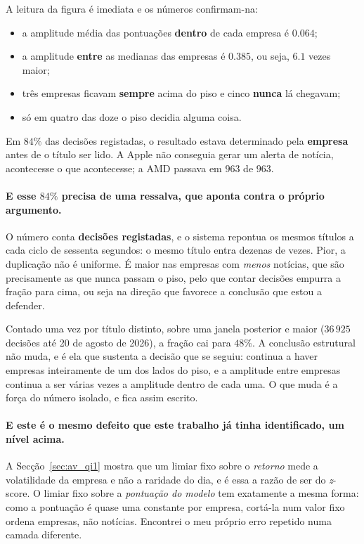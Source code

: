 A leitura da figura é imediata e os números confirmam-na:

\begin{itemize}
  \item a amplitude média das pontuações \textbf{dentro} de cada empresa é $0.064$;
  \item a amplitude \textbf{entre} as medianas das empresas é $0.385$, ou seja, $6.1$ vezes maior;
  \item três empresas ficavam \textbf{sempre} acima do piso e cinco \textbf{nunca} lá chegavam;
  \item só em quatro das doze o piso decidia alguma coisa.
\end{itemize}

\begin{tcolorbox}[colback=orange!5, colframe=orange!45, boxrule=0.5pt, arc=2pt]
Em \textbf{$84\%$} das decisões registadas, o resultado estava determinado pela
\textbf{empresa} antes de o título ser lido. A Apple não conseguia gerar um alerta de notícia,
acontecesse o que acontecesse; a AMD passava em $963$ de $963$.
\end{tcolorbox}

\paragraph{E esse $84\%$ precisa de uma ressalva, que aponta contra o próprio argumento.}
O número conta \textbf{decisões registadas}, e o sistema repontua os mesmos títulos a cada ciclo
de sessenta segundos: o mesmo título entra dezenas de vezes. Pior, a duplicação não é uniforme.
É maior nas empresas com \emph{menos} notícias, que são precisamente as que nunca passam o piso,
pelo que contar decisões empurra a fração para cima, ou seja na direção que favorece a conclusão
que estou a defender.

Contado uma vez por título distinto, sobre uma janela posterior e maior
($36\,925$ decisões até 20 de agosto de 2026), a fração cai para $48\%$. A conclusão estrutural
não muda, e é ela que sustenta a decisão que se seguiu: continua a haver empresas inteiramente
de um dos lados do piso, e a amplitude entre empresas continua a ser várias vezes a amplitude
dentro de cada uma. O que muda é a força do número isolado, e fica assim escrito.

\paragraph{E este é o mesmo defeito que este trabalho já tinha identificado, um nível acima.}
A Secção~\ref{sec:av_qi1} mostra que um limiar fixo sobre o \emph{retorno} mede a volatilidade da
empresa e não a raridade do dia, e é essa a razão de ser do \emph{z}-score. O limiar fixo sobre a
\emph{pontuação do modelo} tem exatamente a mesma forma: como a pontuação é quase uma constante por
empresa, cortá-la num valor fixo ordena empresas, não notícias. Encontrei o meu próprio erro
repetido numa camada diferente.

